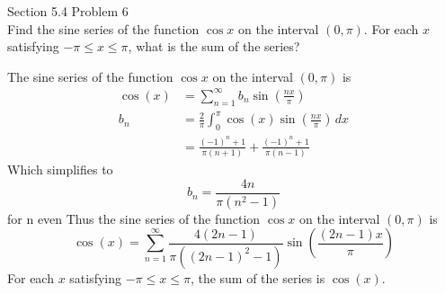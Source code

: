 \documentclass[answers,12pt,addpoints]{exam}
\begin{document}
\begin{questions}
    \question[10] Section 5.4 Problem 6\\
    Find the sine series of the function $\cos x$ on the interval $(0, \pi)$. For each $x$ satisfying $-\pi \leq x \leq \pi$, what is the sum of the series?
    \begin{solution}
        The sine series of the function $\cos x$ on the interval $(0, \pi)$ is
        \begin{align*}
            \cos(x) &= \sum_{n=1}^{\infty} b_n \sin(\frac{nx}{\pi}) \\
            b_n &= \frac{2}{\pi} \int_{0}^{\pi} \cos(x) \sin(\frac{nx}{\pi}) \, dx \\
            &= \frac{(-1)^n +1 }{\pi(n+1)} + \frac{(-1)^n + 1}{\pi(n-1)} 
        \end{align*}
        Which simplifies to 
        $$ b_n = \frac{4n}{\pi(n^2-1)}$$ 
        for n even
        Thus the sine series of the function $\cos x$ on the interval $(0, \pi)$ is
        $$ \cos(x) = \sum_{n=1}^{\infty} \frac{4(2n-1)}{\pi((2n-1)^2-1)} \sin(\frac{(2n-1)x}{\pi})$$
        For each $x$ satisfying $-\pi \leq x \leq \pi$, the sum of the series is $\cos(x)$.
    \end{solution}


\end{questions}
\end{document}
